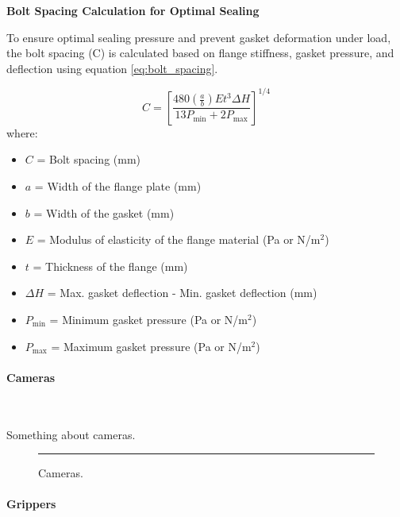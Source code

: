 \textbf{Bolt Spacing Calculation for Optimal Sealing}

To ensure optimal sealing pressure and prevent gasket deformation under load, the bolt spacing (C) is calculated based on flange stiffness, gasket pressure, and deflection using equation \ref{eq:bolt_spacing}.

\begin{equation} \label{eq:bolt_spacing}
    C = \left[ \frac{480 \left( \frac{a}{b} \right) E t^3 \Delta H}{13 P_{\text{min}} + 2 P_{\text{max}}} \right]^{1/4}
    \end{equation}
    where:
    \vspace{-0.5\baselineskip}
    \begin{itemize}
        \setlength{\itemsep}{0pt}
        \item \(C\) = Bolt spacing (mm)
        \item \(a\) = Width of the flange plate (mm)
        \item \(b\) = Width of the gasket (mm)
        \item \(E\) = Modulus of elasticity of the flange material (Pa or N/m\(^2\))
        \item \(t\) = Thickness of the flange (mm)
        \item \(\Delta H\) = Max. gasket deflection - Min. gasket deflection (mm)
        \item \(P_{\text{min}}\) = Minimum gasket pressure (Pa or N/m\(^2\))
        \item \(P_{\text{max}}\) = Maximum gasket pressure (Pa or N/m\(^2\))
    \end{itemize}
    

\vspace{-0.3cm}
\paragraph{Cameras} \ \\
\vspace{-0.5cm}

Something about cameras. \lipsum[1]

\begin{figure}[h]
    \centering
    \rule{0.8\columnwidth}{4cm}
    \caption{Cameras.}
    \label{fig:cameras}
\end{figure}

\vspace{-0.3cm}
\paragraph{Grippers} \ \\
\vspace{-0.5cm}

